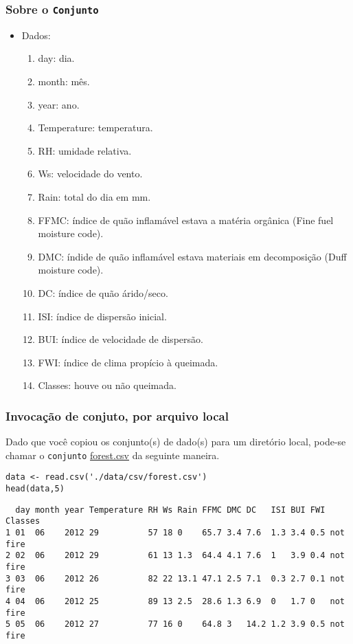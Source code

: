 \documentclass[12pt]{article}
\begin{document}
\subsubsection{Sobre o \texttt{Conjunto}}
\label{sec:orga9a8717}
\begin{itemize}
\item Dados:
\begin{enumerate}
\item day: dia.
\item month: mês.
\item year: ano.
\item Temperature: temperatura.
\item RH: umidade relativa.
\item Ws: velocidade do vento.
\item Rain: total do dia em mm.
\item FFMC: índice de quão inflamável estava a matéria orgânica (Fine fuel moisture code).
\item DMC: índide de quão inflamável estava materiais em decomposição (Duff moisture code).
\item DC: índice de quão árido/seco.
\item ISI: índice de dispersão inicial.
\item BUI: índice de velocidade de dispersão.
\item FWI: índice de clima propício à queimada.
\item Classes: houve ou não queimada.
\end{enumerate}
\end{itemize}

\subsubsection{Invocação de conjuto, por arquivo local}
\label{sec:org82ad133}

Dado que você copiou os conjunto(s) de dado(s) para um diretório
local, pode-se chamar o \texttt{conjunto} \href{https://drive.google.com/file/d/1zuMrZgUo9vRH80HA7zJiBRJpBkGBw3hb/view?usp=sharing}{forest.csv} da seguinte maneira.

\begin{verbatim}
data <- read.csv('./data/csv/forest.csv')
head(data,5)
\end{verbatim}

\begin{verbatim}
  day month year Temperature RH Ws Rain FFMC DMC DC   ISI BUI FWI Classes    
1 01  06    2012 29          57 18 0    65.7 3.4 7.6  1.3 3.4 0.5 not fire   
2 02  06    2012 29          61 13 1.3  64.4 4.1 7.6  1   3.9 0.4 not fire   
3 03  06    2012 26          82 22 13.1 47.1 2.5 7.1  0.3 2.7 0.1 not fire   
4 04  06    2012 25          89 13 2.5  28.6 1.3 6.9  0   1.7 0   not fire   
5 05  06    2012 27          77 16 0    64.8 3   14.2 1.2 3.9 0.5 not fire   
\end{verbatim}
\clearpage
\end{document}
